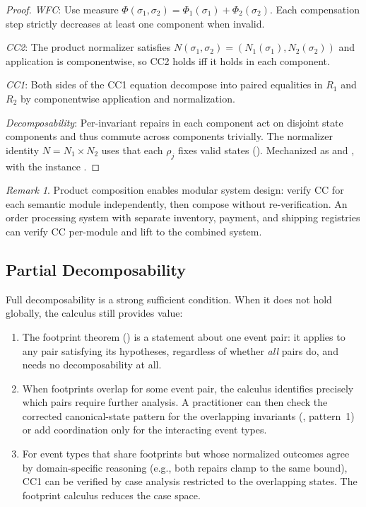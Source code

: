 \documentclass[11pt,a4paper]{article}
\theoremstyle{plain}
\theoremstyle{definition}
\theoremstyle{remark}
\newtheorem{remark}[theorem]{Remark}
\begin{document}
\begin{proof}
\emph{WFC}: Use measure $\Phi(\sigma_1, \sigma_2) = \Phi_1(\sigma_1) +
\Phi_2(\sigma_2)$.  Each compensation step strictly decreases at least one
component when invalid.

\emph{CC2}: The product normalizer satisfies $N(\sigma_1, \sigma_2) =
(N_1(\sigma_1), N_2(\sigma_2))$ and application is componentwise, so
CC2 holds iff it holds in each component.

\emph{CC1}: Both sides of the CC1 equation decompose into paired equalities
in $R_1$ and $R_2$ by componentwise application and normalization.

\emph{Decomposability}: Per-invariant repairs in each component act on
disjoint state components and thus commute across components trivially.
The normalizer identity $N = N_1 \times N_2$ uses that each $\rho_j$ fixes
valid states ().  Mechanized as 
and , with the instance
.
\end{proof}

\begin{remark}
Product composition enables modular system design: verify CC for each semantic
module independently, then compose without re-verification.  An order
processing system with separate inventory, payment, and shipping registries
can verify CC per-module and lift to the combined system.
\end{remark}

\subsection{Partial Decomposability}

Full decomposability is a strong sufficient condition.  When it does not hold
globally, the calculus still provides value:

\begin{enumerate}[leftmargin=*,nosep]
\item The footprint theorem () is a statement about
  one event pair: it applies to any pair satisfying its hypotheses,
  regardless of whether \emph{all} pairs do, and 
  needs no decomposability at all.
\item When footprints overlap for some event pair, the calculus identifies
  precisely which pairs require further analysis.  A practitioner can then
  check the corrected canonical-state pattern for the overlapping invariants
  (, pattern~1) or add
  coordination only for the interacting event types.
\item For event types that share footprints but whose normalized outcomes
  agree by domain-specific reasoning (e.g., both repairs clamp to the same
  bound), CC1 can be verified by case analysis restricted to the overlapping
  states.  The footprint calculus reduces the case space.
\end{enumerate}
\end{document}
